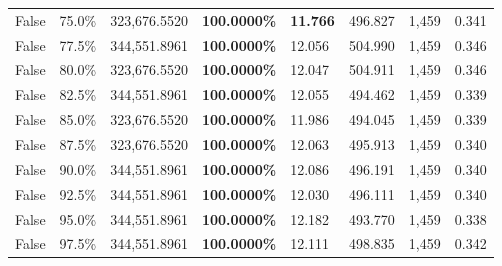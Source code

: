 \begin{table}[H]
\begin{tabular}{lllrllll}
\cline{1-8}
False & 75.0\% & 323,676.5520 & \bfseries \color{red} 100.0000\% & \bfseries \color{red} 11.766 & 496.827 & 1,459 & 0.341 \\
\cline{1-8}
False & 77.5\% & 344,551.8961 & \bfseries \color{red} 100.0000\% & 12.056 & 504.990 & 1,459 & 0.346 \\
\cline{1-8}
False & 80.0\% & 323,676.5520 & \bfseries \color{red} 100.0000\% & 12.047 & 504.911 & 1,459 & 0.346 \\
\cline{1-8}
False & 82.5\% & 344,551.8961 & \bfseries \color{red} 100.0000\% & 12.055 & 494.462 & 1,459 & 0.339 \\
\cline{1-8}
False & 85.0\% & 323,676.5520 & \bfseries \color{red} 100.0000\% & 11.986 & 494.045 & 1,459 & 0.339 \\
\cline{1-8}
False & 87.5\% & 323,676.5520 & \bfseries \color{red} 100.0000\% & 12.063 & 495.913 & 1,459 & 0.340 \\
\cline{1-8}
False & 90.0\% & 344,551.8961 & \bfseries \color{red} 100.0000\% & 12.086 & 496.191 & 1,459 & 0.340 \\
\cline{1-8}
False & 92.5\% & 344,551.8961 & \bfseries \color{red} 100.0000\% & 12.030 & 496.111 & 1,459 & 0.340 \\
\cline{1-8}
False & 95.0\% & 344,551.8961 & \bfseries \color{red} 100.0000\% & 12.182 & 493.770 & 1,459 & 0.338 \\
\cline{1-8}
False & 97.5\% & 344,551.8961 & \bfseries \color{red} 100.0000\% & 12.111 & 498.835 & 1,459 & 0.342 \\
\cline{1-8}
\bottomrule
\end{tabular}
\end{table}
